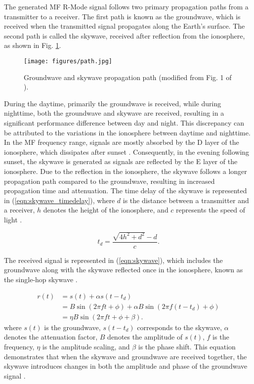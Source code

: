 \documentclass[conference]{IEEEtran}
\begin{document}
The generated MF R-Mode signal follows two primary propagation paths from a transmitter to a receiver. 
The first path is known as the groundwave, which is received when the transmitted signal propagates along the Earth's surface. 
The second path is called the skywave, received after reflection from the ionosphere, as shown in Fig. \ref{fig:path}.

\begin{figure}
    \centering
    \texttt{[image: figures/path.jpg]}
    \caption{Groundwave and skywave propagation path (modified from Fig. 1 of \cite{Jeong21:Development}).}
    \label{fig:path}
\end{figure}

During the daytime, primarily the groundwave is received, while during nighttime, both the groundwave and skywave are received, resulting in a significant performance difference between day and night. 
This discrepancy can be attributed to the variations in the ionosphere between daytime and nighttime. 
In the MF frequency range, signals are mostly absorbed by the D layer of the ionosphere, which dissipates after sunset \cite{ITU1998, poppe1995}. 
Consequently, in the evening following sunset, the skywave is generated as signals are reflected by the E layer of the ionosphere. 
Due to the reflection in the ionosphere, the skywave follows a longer propagation path compared to the groundwave, resulting in increased propagation time and attenuation. 
The time delay of the skywave is represented in (\ref{eqn:skywave_timedelay}), where $d$ is the distance between a transmitter and a receiver, $h$ denotes the height of the ionosphere, and $c$ represents the speed of light \cite{Jeong21:Development}.

\begin{equation} 
 \label{eqn:skywave_timedelay}
    t_{d}=\frac{\sqrt{4 h^2 + d^2}-d}{c}.
 \end{equation}
 
The received signal is represented in (\ref{eqn:skywave}), which includes the groundwave along with the skywave reflected once in the ionosphere, known as the single-hop skywave \cite{Johnson2014:feasibility3}.

\begin{equation} 
 \label{eqn:skywave}
 \begin{split}
    r\left ( t \right )
    &= s\left ( t \right )+\alpha s\left ( t-t_{d} \right )\\ 
    &= B\sin \left (  2\pi ft+\phi \right )+\alpha B\sin \left (  2\pi f\left ( t-t_{d}\right)+\phi \right )\\
    &= \eta B\sin \left (  2\pi ft+\phi +\beta \right).
\end{split}
\end{equation}
where $s(t)$ is the groundwave, $s(t-t_{d})$ corresponds to the skywave, $\alpha$ denotes the attenuation factor, $B$ denotes the amplitude of $s(t)$, $f$ is the frequency, $\eta$ is the amplitude scaling, and $\beta$ is the phase shift.
This equation demonstrates that when the skywave and groundwave are received together, the skywave introduces changes in both the amplitude and phase of the groundwave signal \cite{Johnson2014:feasibility3}.
\end{document}

